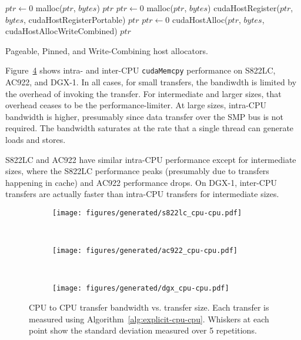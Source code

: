\begin{algorithm}[H]
	\begin{algorithmic}[1]
		\Statex
		\State $ptr \gets 0$
		\State malloc($ptr$, $bytes$)
		\State \Return $ptr$
		\EndFunction
		\Statex
		\State $ptr \gets 0$
		\State malloc($ptr$, $bytes$)
		\State cudaHostRegister($ptr$, $bytes$, cudaHostRegisterPortable)
		\State \Return $ptr$
		\EndFunction
		\Statex
		\State $ptr \gets 0$
		\State cudaHostAlloc($ptr$, $bytes$, cudaHostAllocWriteCombined)
		\State \Return $ptr$
		\EndFunction
		
	\end{algorithmic}
	\caption[Pageable, Pinned, and Write-Combining host allocators.]{
        Pageable, Pinned, and Write-Combining host allocators.
	}
	\label{alg:host-allocators}
\end{algorithm}

Figure~\ref{fig:explicit-cpu-cpu} shows intra- and inter-CPU \texttt{cudaMemcpy} performance on S822LC, AC922, and DGX-1.
In all cases, for small transfers, the bandiwdth is limited by the overhead of invoking the transfer.
For intermediate and larger sizes, that overhead ceases to be the performance-limiter.
At large sizes, intra-CPU bandwidth is higher, presumably since data transfer over the SMP bus is not required.
The bandwidth saturates at the rate that a single thread can generate loads and stores.

S822LC and AC922 have similar intra-CPU performance except for intermediate sizes, where the S822LC performance peaks (presumably due to transfers happening in cache) and AC922 performance drops.
On DGX-1, inter-CPU transfers are actually faster than intra-CPU transfers for intermediate sizes.

\begin{figure}[H]
	\centering
	\begin{subfigure}[b]{0.31\textwidth}
		\texttt{[image: figures/generated/s822lc\_cpu-cpu.pdf]}
		\caption{}
		\label{fig:s822lc-cpu0-cpu1-dst}
	\end{subfigure}
	~
	\begin{subfigure}[b]{0.31\textwidth}
		\texttt{[image: figures/generated/ac922\_cpu-cpu.pdf]}
		\caption{}
		\label{fig:ac922-cpu0-cpu1-dst}
	\end{subfigure}
	~
	\begin{subfigure}[b]{0.31\textwidth}
		\texttt{[image: figures/generated/dgx\_cpu-cpu.pdf]}
		\caption{}
		\label{fig:dgx-cpu0-cpu1-dst}
	\end{subfigure}
	\caption[CPU to CPU transfer bandwidth]{
		CPU to CPU transfer bandwidth vs. transfer size.
		Each transfer is measured using Algorithm~\ref{alg:explicit-cpu-cpu}.
		Whiskers at each point show the standard deviation measured over 5 repetitions.
	}
	\label{fig:explicit-cpu-cpu}
\end{figure}

